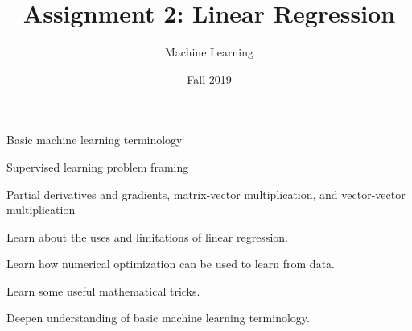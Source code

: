 \documentclass[assignment02_Solutions]{subfiles}
\title{Assignment 2: Linear Regression}
\author{Machine Learning}
\date{Fall 2019}
\begin{document}
\maketitle
\thispagestyle{firstpage}

\begin{priorknowledge}

\bi
\item Basic machine learning terminology
\item Supervised learning problem framing
\item Partial derivatives and gradients, matrix-vector multiplication, and vector-vector multiplication
\ei
\end{priorknowledge}


\begin{learningobjectives}
\bi
\item Learn about the uses and limitations of linear regression.
\item Learn how numerical optimization can be used to learn from data.
\item Learn some useful mathematical tricks.
\item Deepen understanding of basic machine learning terminology.
\ei
\end{learningobjectives}
\end{document}
